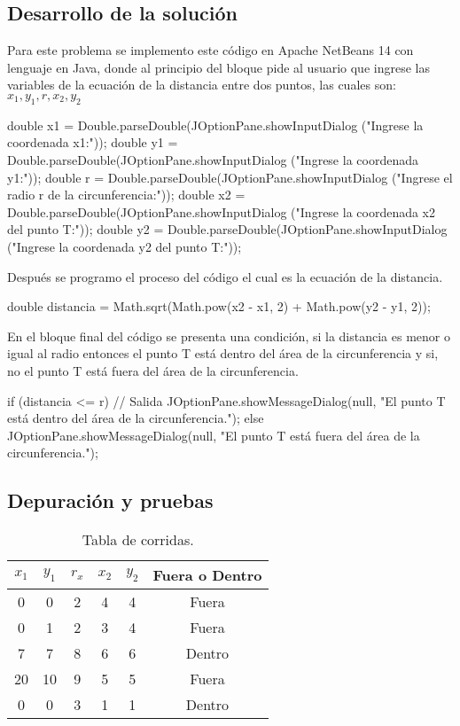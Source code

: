 \subsection{Desarrollo de la solución}
Para este problema se implemento este código en Apache NetBeans 14 con lenguaje en Java, donde al principio del bloque pide al usuario que ingrese las variables de la ecuación de la distancia entre dos puntos, las cuales son: $x_{1},y_{1},r,x_{2},y_{2}$
\begin{javaCode}
  double x1 = Double.parseDouble(JOptionPane.showInputDialog
       ("Ingrese la coordenada x1:"));
  double y1 = Double.parseDouble(JOptionPane.showInputDialog
       ("Ingrese la coordenada y1:"));
  double r = Double.parseDouble(JOptionPane.showInputDialog
       ("Ingrese el radio r de la circunferencia:"));
  double x2 = Double.parseDouble(JOptionPane.showInputDialog
       ("Ingrese la coordenada x2 del punto T:"));
  double y2 = Double.parseDouble(JOptionPane.showInputDialog
       ("Ingrese la coordenada y2 del punto T:"));
\end{javaCode}
Después se programo el proceso del código  el cual es la ecuación de la distancia.
\begin{javaCode}
    double distancia = Math.sqrt(Math.pow(x2 - x1, 2) + Math.pow(y2 - y1, 2));
\end{javaCode}
En el bloque final del código se presenta una condición, si la distancia es menor o igual al radio entonces el punto T está dentro del área de la circunferencia y si, no el punto T está fuera del área de la circunferencia.
\begin{javaCode}
 if (distancia <= r) {
            // Salida
            JOptionPane.showMessageDialog(null, "El punto T está dentro del área de la circunferencia.");
        } else {
            JOptionPane.showMessageDialog(null, "El punto T está fuera del área de la circunferencia.");
        }
\end{javaCode}
\subsection{Depuración y pruebas}
\begin{table}[!ht]
\label{T:equipos}
\begin{center}
\begin{tabular}{| c | c | c | c | c | c |}
\hline
\textbf{$x_{1}$} & \textbf{$y_{1}$} & \textbf{$r_x$} & \textbf{$x_{2}$} & \textbf{$y_{2}$} & \textbf{Fuera o Dentro}\\
\hline
0 & 0 & 2 & 4 & 4 & Fuera \\
0 & 1 & 2 & 3 & 4 & Fuera \\
7 & 7 & 8 & 6 & 6 & Dentro \\
20 & 10 & 9 & 5 & 5 & Fuera\\
0 & 0 & 3 & 1 & 1 & Dentro\\
\hline
\end{tabular}
\caption{Tabla de corridas.}
\end{center}
\end{table}
